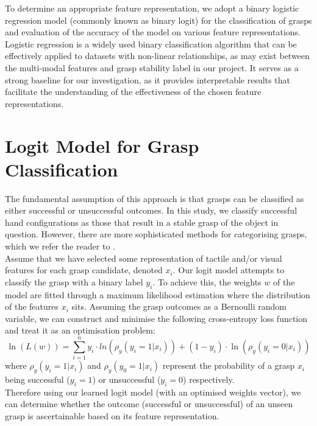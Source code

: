 \documentclass[11pt, a4paper]{report}
\begin{document}
To determine an appropriate feature representation, we adopt a binary logistic regression model (commonly known as binary logit) for the classification of grasps and evaluation of the accuracy of the model on various feature representations. Logistic regression is a widely used binary classification algorithm that can be effectively applied to datasets with non-linear relationships, as may exist between the multi-modal features and grasp stability label in our project. It serves as a strong baseline for our investigation, as it provides interpretable results that facilitate the understanding of the effectiveness of the chosen feature representations.\\


\section{Logit Model for Grasp Classification}\label{sec:4.1}
The fundamental assumption of this approach is that grasps can be classified as either successful or unsuccessful outcomes.  In this study, we classify successful hand configurations as those that result in a stable grasp of the object in question. However, there are more sophisticated methods for categorising grasps, which we refer the reader to \cite{Bekiroglu2012LearningTA, si2022grasp}.\\

Assume that we have selected some representation of tactile and/or visual features for each grasp candidate, denoted $x_i$. Our logit model attempts to classify the grasp with a binary label $y_i$. To achieve this, the weights $w$ of the model are fitted through a maximum likelihood estimation where the distribution of the features $x_i$ sits. Assuming the grasp outcomes as a Bernoulli random variable, we can construct and minimise the following cross-entropy loss function and treat it as an optimisation problem:
\begin{equation}
    \ln(L(w))=\sum^n_{i=1}y_i\cdot ln(\rho_y(y_i=1|x_i))+(1-y_i)\cdot\ln(\rho_y(y_i=0|x_i))
\end{equation}
where $\rho_y(y_i=1|x_i)$ and $\rho_y(y_0=1|x_i)$ represent the probability of a grasp $x_i$ being successful ($y_i=1$) or unsuccessful ($y_i=0$) respectively.\\

Therefore using our learned logit model (with an optimised weights vector), we can determine whether the outcome (successful or unsuccessful) of an unseen grasp is ascertainable based on its feature representation.
\end{document}
